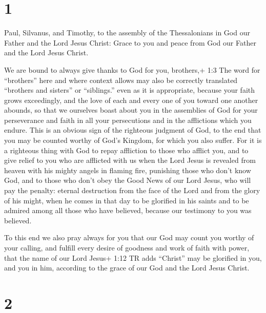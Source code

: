 \hypertarget{section}{%
\section{1}\label{section}}

 Paul, Silvanus, and Timothy, to the assembly of the
Thessalonians in God our Father and the Lord Jesus Christ: 
Grace to you and peace from God our Father and the Lord Jesus Christ.

 We are bound to always give thanks to God for you,
brothers,+ 1:3 The word for ``brothers'' here and where context allows
may also be correctly translated ``brothers and sisters'' or
``siblings.'' even as it is appropriate, because your faith grows
exceedingly, and the love of each and every one of you toward one
another abounds,  so that we ourselves boast about you in
the assemblies of God for your perseverance and faith in all your
persecutions and in the afflictions which you endure.  This
is an obvious sign of the righteous judgment of God, to the end that you
may be counted worthy of God's Kingdom, for which you also suffer.
 For it is a righteous thing with God to repay affliction to
those who afflict you,  and to give relief to you who are
afflicted with us when the Lord Jesus is revealed from heaven with his
mighty angels in flaming fire,  punishing those who don't
know God, and to those who don't obey the Good News of our Lord Jesus,
 who will pay the penalty: eternal destruction from the face
of the Lord and from the glory of his might,  when he comes
in that day to be glorified in his saints and to be admired among all
those who have believed, because our testimony to you was believed.

 To this end we also pray always for you that our God may
count you worthy of your calling, and fulfill every desire of goodness
and work of faith with power,  that the name of our Lord
Jesus+ 1:12 TR adds ``Christ'' may be glorified in you, and you in him,
according to the grace of our God and the Lord Jesus Christ.

\hypertarget{section-1}{%
\section{2}\label{section-1}}

